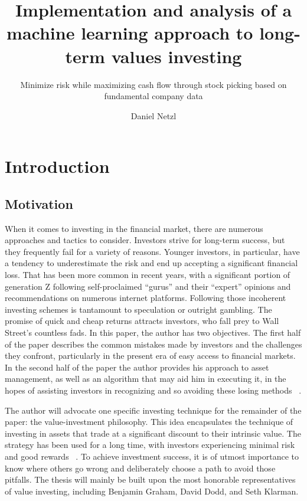 \documentclass{imc-inf}
\title{Implementation and analysis of a machine learning approach to long-term values investing}
\subtitle{Minimize risk while maximizing cash flow through stock picking based on fundamental company data}
\author{Daniel Netzl}
\begin{document}
\frontmatter\maketitle{}


\begin{declarations}\end{declarations}


%
\tableofcontents%
\clearpage


%
\listoftables
\clearpage


%
\listoffigures
\clearpage


\mainmatter%

\chapter{Introduction}\label{chap:introduction}

\section{Motivation}%
When it comes to investing in the financial market, there are numerous approaches and tactics to consider. Investors strive for long-term success, but they frequently fail for a variety of reasons. Younger investors, in particular, have a tendency to underestimate the risk and end up accepting a significant financial loss. That has been more common in recent years, with a significant portion of generation Z following self-proclaimed “gurus” and their “expert” opinions and recommendations on numerous internet platforms. Following those incoherent investing schemes is tantamount to speculation or outright gambling. The promise of quick and cheap returns attracts investors, who fall prey to Wall Street's countless fads. In this paper, the author has two objectives. The first half of the paper describes the common mistakes made by investors and the challenges they confront, particularly in the present era of easy access to financial markets. In the second half of the paper the author provides his approach to asset management, as well as an algorithm that may aid him in executing it, in the hopes of assisting investors in recognizing and so avoiding these losing methods ~\cite{margin_of_safety}.

The author will advocate one specific investing technique for the remainder of the paper: the value-investment philosophy. This idea encapsulates the technique of investing in assets that trade at a significant discount to their intrinsic value. The strategy has been used for a long time, with investors experiencing minimal risk and good rewards ~\cite{margin_of_safety}.
To achieve investment success, it is of utmost importance to know where others go wrong and deliberately choose a path to avoid those pitfalls. The thesis will mainly be built upon the most honorable representatives of value investing, including Benjamin Graham, David Dodd, and Seth Klarman. 
\end{document}
